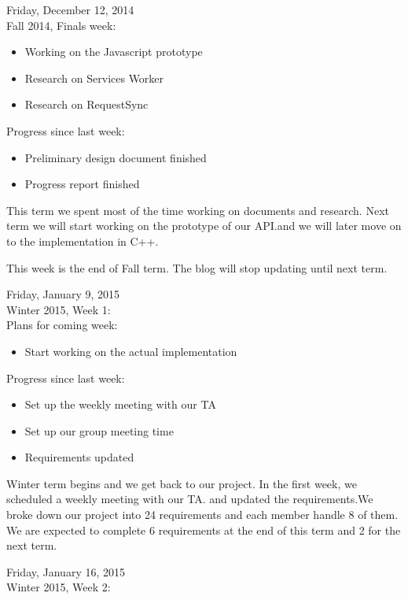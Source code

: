 Friday, December 12, 2014 \\
​Fall 2014, Finals week:​​ \\

\begin{itemize}
Plans for the next term:​
​\item ​Working on the Javascript prototype
​\item Research on Services Worker
\item Research on RequestSync​​​​
\end{itemize}

Progress since last week:​
\begin{itemize}
\item ​Preliminary design document​ finished
​\item Progress report finished​​​​
\end{itemize}

​​This term we spent most of the time working on documents and research. ​​​Next term we will start working on the prototype of our API.​​ ​and we will later move on to the implementation in C++​.​

This week is the end of Fall term. The blog will stop updating until next term.

Friday, January 9, 2015 \\
​Winter 2015, Week 1: \\

Plans for coming week:
\begin{itemize}
\item Start working on ​​​​​the actual implementation​​
\end{itemize}

Progress since last week:
\begin{itemize}
\item Set up the weekly meeting with our TA
\item Set up our group meeting time
\item Requirements updated
​​​\end{itemize}

Winter term begins and we get back to our project. In the first week, we scheduled a weekly meeting with our TA. and updated the requirements. ​​​​We broke down our project into 24 requirements and each member handle 8 of them. We are expected to complete 6 requirements at the end of this term and 2 for the next term. 

Friday, January 16, 2015 \\
​Winter 2015, Week 2: \\

